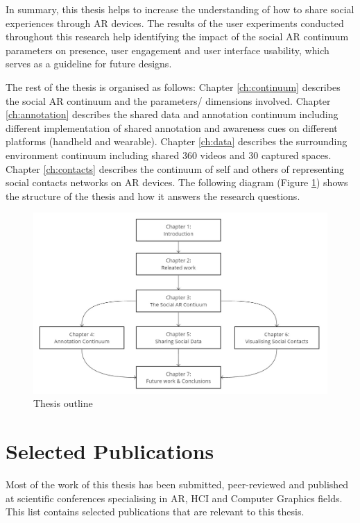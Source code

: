 In summary, this thesis helps to increase the understanding of how to share social experiences through AR devices. The results of the user experiments conducted throughout this research help identifying the impact of the social AR continuum parameters on presence, user engagement and user interface usability, which serves as a guideline for future designs. 

The rest of the thesis is organised as follows: Chapter \ref{ch:continuum} describes the social AR continuum and the parameters/ dimensions involved. Chapter \ref{ch:annotation} describes the shared data and annotation continuum including different implementation of shared annotation and awareness cues on different platforms (handheld and wearable). Chapter \ref{ch:data} describes the surrounding environment continuum including shared 360 videos and 30 captured spaces. Chapter \ref{ch:contacts} describes the continuum of self and others of representing social contacts networks on AR devices. The following diagram (Figure \ref{fig:thesis-outline}) shows the structure of the thesis and how it answers the research questions. 

\begin{figure}
    \centering
    \includegraphics[width=\linewidth]{images/thesis-outline.png}
    \caption{Thesis outline}
    \label{fig:thesis-outline}
\end{figure}

\section{Selected Publications}

Most of the work of this thesis has been submitted, peer-reviewed and published at scientific conferences specialising in AR, HCI and Computer Graphics fields. This list contains selected publications that are relevant to this thesis. 

